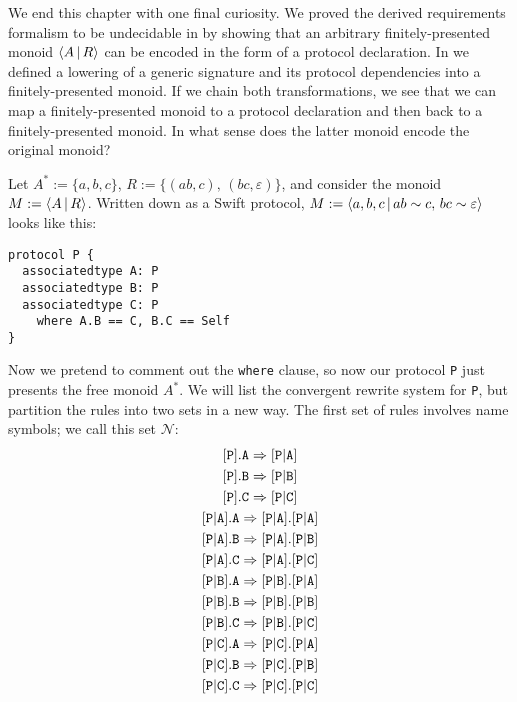 \documentclass[../generics]{subfiles}
\begin{document}
\begin{example}\label{double encoding}
We end this chapter with one final curiosity. We proved the derived requirements formalism to be undecidable in  by showing that an arbitrary finitely-presented monoid $\langle A\,|\,R\rangle$ can be encoded in the form of a protocol declaration. In  we defined a lowering of a generic signature and its protocol dependencies into a finitely-presented monoid. If we chain both transformations, we see that we can map a finitely-presented monoid to a protocol declaration and then back to a finitely-presented monoid. In what sense does the latter monoid encode the original monoid?

Let $A^*:=\{a,b,c\}$, $R:=\{(ab,c),\,(bc,\varepsilon)\}$, and consider the monoid $M:=\langle A\,|\,R\rangle$. Written down as a Swift protocol, $M := \langle a,b,c\,|\,ab\sim c,\,bc\sim\varepsilon\rangle$ looks like this:
\begin{Verbatim}
protocol P {
  associatedtype A: P
  associatedtype B: P
  associatedtype C: P
    where A.B == C, B.C == Self
}
\end{Verbatim}
Now we pretend to comment out the \texttt{where} clause, so now our protocol \texttt{P} just presents the free monoid $A^*$. We will list the convergent rewrite system for \texttt{P}, but partition the rules into two sets in a new way. The first set of rules involves name symbols; we call this set $\mathcal{N}$:
\begin{gather*}
\AssocIntro{P}{A}\\
\AssocIntro{P}{B}\\
\AssocIntro{P}{C}\\
\assocsym{P}{A}.\texttt{A}\Rightarrow\assocsym{P}{A}.\assocsym{P}{A}\\
\assocsym{P}{A}.\texttt{B}\Rightarrow\assocsym{P}{A}.\assocsym{P}{B}\\
\assocsym{P}{A}.\texttt{C}\Rightarrow\assocsym{P}{A}.\assocsym{P}{C}\\
\assocsym{P}{B}.\texttt{A}\Rightarrow\assocsym{P}{B}.\assocsym{P}{A}\\
\assocsym{P}{B}.\texttt{B}\Rightarrow\assocsym{P}{B}.\assocsym{P}{B}\\
\assocsym{P}{B}.\texttt{C}\Rightarrow\assocsym{P}{B}.\assocsym{P}{C}\\
\assocsym{P}{C}.\texttt{A}\Rightarrow\assocsym{P}{C}.\assocsym{P}{A}\\
\assocsym{P}{C}.\texttt{B}\Rightarrow\assocsym{P}{C}.\assocsym{P}{B}\\
\assocsym{P}{C}.\texttt{C}\Rightarrow\assocsym{P}{C}.\assocsym{P}{C}

\end{gather*}
\end{example}
\end{document}
